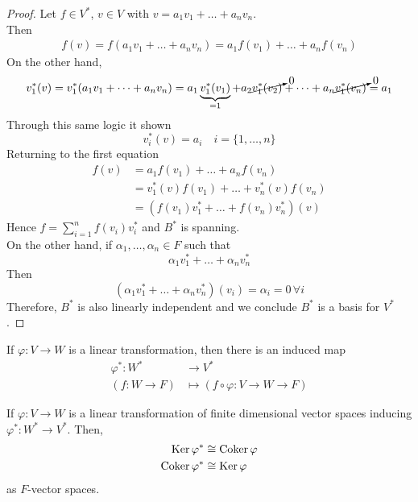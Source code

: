 \documentclass[../Main.tex]{subfiles}
\begin{document}
\begin{proof}
	Let $f\in V^\ast$, $v\in V$ with $v=a_1v_1+\dots+a_nv_n$.\\
	Then
	\begin{align*}
	f(v)=f(a_1v_1+\dots+a_nv_n) = a_1f(v_1)+\dots+a_nf(v_n)
	\end{align*}
	On the other hand,
	\begin{align*}
	v_1^\ast(v) = v_1^\ast (a_1v_1+\dots+a_nv_n) =a_1\underbrace{v_1^\ast(v_1)}_{=1}+a_2\cancelto{0}{v_1^\ast(v_2)}+\dots+a_n\cancelto{0}{v_1^\ast(v_n)} = a_1
	\end{align*}
	Through this same logic it shown
	\[v_i^\ast(v)=a_i\quad i=\{1,\dots,n\}\]
	Returning to the first equation
	\begin{align*}
	f(v)&=a_1f(v_1)+\dots+a_nf(v_n) \\
	&= v_1^\ast(v)f(v_1)+\dots+v_n^\ast(v)f(v_n)\\
	&=(f(v_1)v_1^\ast +\dots + f(v_n)v_n^\ast)(v)
	\end{align*}
	Hence $f=\sum_{i=1}^nf(v_i)v_i^\ast$ and $B^\ast$ is spanning.\\
	On the other hand, if $\alpha_1,\dots,\alpha_n\in F$ such that 
	\[\alpha_1v_1^\ast+\dots+\alpha_nv_n^\ast\]
	Then
	\[(\alpha_1v_1^\ast+\dots+\alpha_nv_n^\ast)(v_i)=\alpha_i=0\, \forall i\]
	Therefore, $B^\ast$ is also linearly independent and we conclude $B^\ast$ is a basis for $V^\ast$.
\end{proof}
\Note If $\varphi\colon V\to W$ is a linear transformation, then there is an induced map
\begin{align*}
\varphi^\ast\colon W^\ast&\to V^\ast\\
(f\colon W\to F)&\mapsto (f\circ\varphi\colon V\to W\to F)
\end{align*}
\begin{thm}
	If $\varphi\colon V\to W$ is a linear transformation of finite dimensional vector spaces inducing $\varphi^\ast \colon W^\ast \to V^\ast$. Then,
	\begin{align*}
	\operatorname{Ker}\varphi^\ast &\cong \operatorname{Coker}\varphi\\
	\operatorname{Coker}\varphi^\ast &\cong \operatorname{Ker}\varphi
	\end{align*}
	as $F$-vector spaces.
\end{thm}
\end{document}
